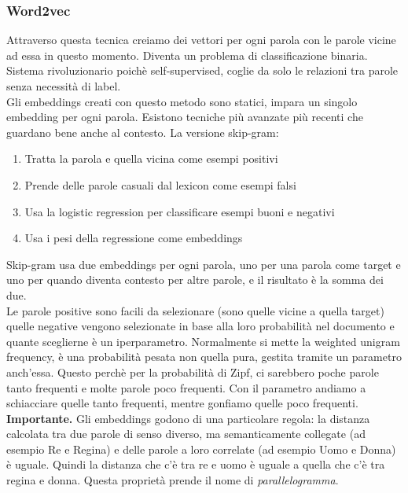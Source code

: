 \subsubsection{Word2vec}
Attraverso questa tecnica creiamo dei vettori per ogni parola con le parole vicine ad essa in questo momento. Diventa un problema di classificazione binaria. Sistema rivoluzionario poichè self-supervised, coglie da solo le relazioni tra parole senza necessità di label. 
\\
Gli embeddings creati con questo metodo sono statici, impara un singolo embedding per ogni parola. Esistono tecniche più avanzate più recenti che guardano bene anche al contesto. La versione skip-gram:
\begin{enumerate}
    \item Tratta la parola e quella vicina come esempi positivi
    \item Prende delle parole casuali dal lexicon come esempi falsi
    \item Usa la logistic regression per classificare esempi buoni e negativi
    \item Usa i pesi della regressione come embeddings
\end{enumerate}
Skip-gram usa due embeddings per ogni parola, uno per una parola come target e uno per quando diventa contesto per altre parole, e il risultato è la somma dei due.
\\
Le parole positive sono facili da selezionare (sono quelle vicine a quella target) quelle negative vengono selezionate in base alla loro probabilità nel documento e quante sceglierne è un iperparametro. Normalmente si mette la weighted unigram frequency, è una probabilità pesata non quella pura, gestita tramite un parametro anch'essa. Questo perchè per la probabilità di Zipf, ci sarebbero poche parole tanto frequenti e molte parole poco frequenti. Con il parametro andiamo a schiacciare quelle tanto frequenti, mentre gonfiamo quelle poco frequenti. 
\\
\textbf{Importante.} Gli embeddings godono di una particolare regola: la distanza calcolata tra due parole di senso diverso, ma semanticamente collegate (ad esempio Re e Regina) e delle parole a loro correlate (ad esempio Uomo e Donna) è uguale. Quindi la distanza che c'è tra re e uomo è uguale a quella che c'è tra regina e donna. Questa proprietà prende il nome di \textit{parallelogramma}.

